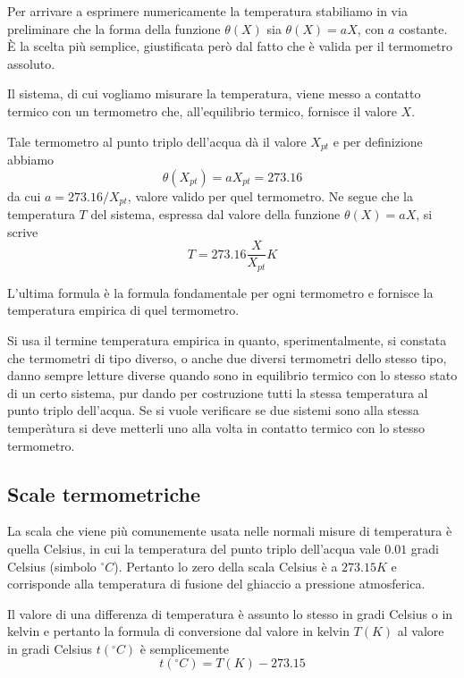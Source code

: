 \documentclass[class=book, crop=false, oneside, 12pt]{standalone}
\begin{document}
Per arrivare a esprimere numericamente la temperatura stabiliamo in via preliminare che la forma della funzione \(\theta(X)\) sia \(\theta(X) = aX\), con \(a\) costante.
È la scelta più semplice, giustificata però dal fatto che è valida per il termometro assoluto.

Il sistema, di cui vogliamo misurare la temperatura, viene messo a contatto termico con un termometro che, all'equilibrio termico, fornisce il valore \(X\).

Tale termometro al punto triplo dell'acqua dà il valore \(X_{pt}\) e per definizione abbiamo
\begin{equation*}
    \theta (X_{pt}) = a X_{pt} = 273.16
\end{equation*}
da cui \(a = 273.16/X_{pt}\), valore valido per quel termometro. Ne segue che la temperatura \(T\) del sistema, espressa dal valore della funzione \(\theta (X) = a X\), si scrive
\begin{equation}
    T = 273.16 \frac{X}{X_{pt}} K    
\end{equation}

L'ultima formula è la formula fondamentale per ogni termometro e fornisce la temperatura empirica di quel termometro.

Si usa il termine temperatura empirica in quanto, sperimentalmente, si constata che termometri di tipo diverso, o anche due diversi termometri dello stesso tipo, danno sempre letture diverse quando sono in equilibrio termico con lo stesso stato di un certo sistema, pur dando per costruzione tutti la stessa temperatura al punto triplo dell'acqua.
Se si  vuole verificare se due sistemi sono alla stessa temperàtura si deve metterli uno alla volta in contatto termico con lo stesso termometro. 

\subsection{Scale termometriche}

La scala che viene più comunemente usata nelle normali misure di temperatura è quella Celsius, in cui la temperatura del punto triplo dell'acqua vale \(0.01\) gradi Celsius (simbolo \(^{\circ} C\)).
Pertanto lo zero della scala Celsius è a \(273.15 K\) e corrisponde alla temperatura di fusione del ghiaccio a pressione atmosferica. 

Il valore di una differenza di temperatura è assunto lo stesso in gradi Celsius o in kelvin e pertanto la formula di conversione dal valore in kelvin \(T (K)\) al valore in gradi Celsius \(t ( ^{\circ} C)\) è semplicemente
\begin{equation*}
    t (^{\circ} C) = T (K) - 273.15
\end{equation*}
\end{document}
